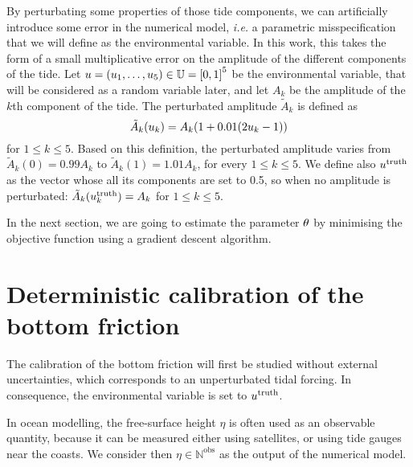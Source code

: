 \documentclass[../../Main_ManuscritThese.tex]{subfiles}
\begin{document}
By perturbating some properties of those tide components, we can
artificially introduce some error in the numerical model, \emph{i.e.}
a parametric misspecification that we will define as the environmental
variable. In this work, this takes the form of a small multiplicative
error on the amplitude of the different components of the tide. Let
$\uu = (\uu_1,\dots,\uu_5)\in \Uspace = \interval{0}{1}^5$ be the
environmental variable, that will be considered as a random variable
later, and let $A_k$ be the amplitude of the $k$th component of the
tide.  The perturbated amplitude $\tilde{A}_k$ is defined as
\begin{equation}
  \label{eq:tide_error}
  \tilde{A}_k(u_k) = A_k (1 + 0.01(2u_k - 1))
\end{equation}
for $1\leq k\leq 5$.
Based on this definition, the perturbated amplitude varies from
$\tilde{A}_k(0) = 0.99A_k$ to $\tilde{A}_k(1) = 1.01A_k$, for every
$1\leq k \leq 5$. We define also $u^{\mathrm{truth}}$ as
the vector whose all its components are set to \num{0.5}, so when no
amplitude is perturbated: $\tilde{A}_k(u_k^{\mathrm{truth}}) = A_k$
for $1\leq k \leq 5$.


In the next section, we are going to estimate the parameter $\theta$ by
minimising the objective function using a gradient descent algorithm.
\section{Deterministic calibration of the bottom friction}
\label{sec:deterministic_calibration_bott}
The calibration of the bottom friction will first be studied without
external uncertainties, which corresponds to an unperturbated tidal
forcing. In consequence, the environmental variable is set to
$u^{\mathrm{truth}}$.

In ocean modelling, the free-surface height $\eta$ is often used as an
observable quantity, because it can be measured either using
satellites, or using tide gauges near the coasts. We consider then
$\eta\in \mathbb{N}^{\mathrm{obs}}$ as the output of the numerical
model.
\end{document}
